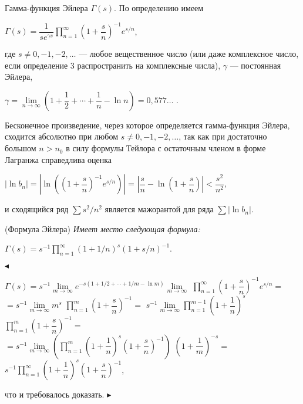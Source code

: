 \begin{example}
Гамма-функция Эйлера $\Gamma(s)$. По определению имеем
\begin{center}
$\Gamma(s) = \dfrac{1}{s e^{\gamma s}}\prod\limits_{n=1}^{\infty}\left(1 + \dfrac sn\right)^{-1}e^{s/n}$,
\end{center}
где $s\ne 0, -1, -2, \ldots$ --- любое вещественное число 
(или даже комплексное число, если определение 3
распространить на комплексные числа), $\gamma$ --- постоянная Эйлера,
\begin{center}
$\gamma = \lim\limits_{n\to\infty}(1 + \dfrac 12 + \cdots + \dfrac 1n - \ln n) = 0,577 \ldots$ .
\end{center}

Бесконечное произведение, через которое определяется гамма-функция Эйлера, сходится абсолютно при любом 
$s\ne 0, -1, -2, \ldots$, так как при достаточно большом $n>n_0$ в силу формулы Тейлора с остаточным членом в форме
Лагранжа справедлива оценка
\begin{center}
$|\ln b_n| = \left|\ln\left(\left(1 + \dfrac sn\right)^{-1}e^{s/n}\right)\right|$ = 
$\left|\dfrac sn - \ln\left(1 + \dfrac sn\right)\right| < \dfrac{s^2}{n^2}$,
\end{center}
и сходящийся ряд $\sum{s^2}/{n^2}$ является мажорантой для ряда $\sum|\ln b_n|$.
\end{example}

\begin{approval}
(Формула Эйлера) \slshape{Имеет место следующая формула:}
\begin{center}
$\Gamma(s) = s^{-1}\prod\nolimits_{n=1}^\infty(1 + 1/n)^s(1 + s/n)^{-1}$.
\end{center}
\end{approval}
$\blacktriangleleft$ \upshape\mdseries{}
\begin{center}
$\Gamma(s) = s^{-1}\lim\limits_{m\to\infty}e^{-s(1 + 1/2 + \cdots + 1/m -\ln m)}\lim\limits_{m\to\infty}$
$\prod\limits_{n=1}^{\infty}\left(1 + \dfrac sn\right)^{-1}e^{s/n} =$\\
$ = s^{-1}\lim\limits_{m\to\infty}m^s$
$\prod\limits_{n=1}^{m}\left(1 + \dfrac sn\right)^{-1} = $
$s^{-1}\lim\limits_{m\to\infty}\prod\limits_{n=1}^{m-1}\left(1 + \dfrac{1}{n}\right)^{s}$
$\prod\limits_{n=1}^{m}\left(1 + \dfrac{s}{n}\right)^{-1} =$\\
$=s^{-1}\lim\limits_{m\to\infty}\left(\prod\limits_{n=1}^{m}\left(1 + \dfrac 1n\right)^{s}\left(1 + \dfrac sn\right)^{-1}\right)$
$\left(1 + \dfrac 1m\right)^{-s}=$
$s^{-1}\prod\limits_{n=1}^{\infty}\left(1 + \dfrac 1n\right)^s\left(1 + \dfrac sn\right)^{-1}$,
\end{center}
что и требовалось доказать. $\blacktriangleright$


